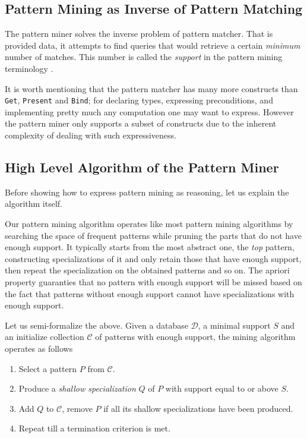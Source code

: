 \documentclass[runningheads]{llncs}
\begin{document}
\subsection{Pattern Mining as Inverse of Pattern Matching}

The pattern miner solves the inverse problem of pattern matcher. That
is provided data, it attempts to find queries that would retrieve a
certain \emph{minimum} number of matches. This number is called the
\emph{support} in the pattern mining terminology \cite{Chi2005Freq,
  Agrawal1994fastalgorithms}.

It is worth mentioning that the pattern matcher has many more
constructs than \texttt{Get}, \texttt{Present} and \texttt{Bind}; for
declaring types, expressing preconditions, and implementing pretty
much any computation one may want to express. However the pattern
miner only supports a subset of constructs due to the inherent
complexity of dealing with such expressiveness.

\subsection{High Level Algorithm of the Pattern Miner}

Before showing how to express pattern mining as reasoning, let us
explain the algorithm itself.

Our pattern mining algorithm operates like most pattern mining
algorithms \cite{Chi2005Freq} by searching the space of frequent
patterns while pruning the parts that do not have enough support. It
typically starts from the most abstract one, the \emph{top} pattern,
constructing specializations of it and only retain those that have
enough support, then repeat the specialization on the obtained
patterns and so on. The apriori property
\cite{Agrawal1994fastalgorithms} guaranties that no pattern with
enough support will be missed based on the fact that patterns without
enough support cannot have specializations with enough support.

Let us semi-formalize the above. Given a database $\mathcal{D}$, a
minimal support $S$ and an initialize collection $\mathcal{C}$ of
patterns with enough support, the mining algorithm operates as follows
\begin{enumerate}
\item Select a pattern $P$ from $\mathcal{C}$.
\item Produce a \emph{shallow specialization} $Q$ of $P$ with support
  equal to or above $S$.
\item Add $Q$ to $\mathcal{C}$, remove $P$ if all its shallow
  specializations have been produced.
\item Repeat till a termination criterion is met.
\end{enumerate}
\end{document}
